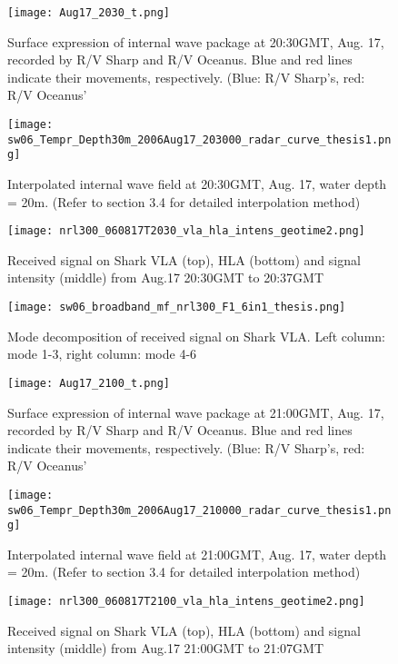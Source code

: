 \begin{figure}[H]
  \centering
  \texttt{[image: Aug17\_2030\_t.png]}
  \caption{Surface expression of internal wave package at 20:30GMT, Aug. 17, recorded by R/V Sharp and R/V Oceanus. Blue and red lines indicate their movements, respectively. (Blue: R/V Sharp's, red: R/V Oceanus'}\label{fig:r2130_r}
\end{figure}

\begin{figure}[H]
  \centering
  \texttt{[image: sw06\_Tempr\_Depth30m\_2006Aug17\_203000\_radar\_curve\_thesis1.png]}
  \caption{Interpolated internal wave field at 20:30GMT, Aug. 17, water depth = 20m. (Refer to section 3.4 for detailed interpolation method)}\label{fig:r2130_i}
\end{figure}

\begin{figure}[H]
  \centering
  \texttt{[image: nrl300\_060817T2030\_vla\_hla\_intens\_geotime2.png]}
  \caption{Received signal on Shark VLA (top), HLA (bottom) and signal intensity (middle) from Aug.17 20:30GMT to 20:37GMT }\label{fig:a2130}
\end{figure}

\begin{figure}[H]
  \centering
  \texttt{[image: sw06\_broadband\_mf\_nrl300\_F1\_6in1\_thesis.png]}
  \caption{Mode decomposition of received signal on Shark VLA. 
    Left column: mode 1-3, right column: mode 4-6 }\label{fig:m2130}
\end{figure}



\begin{figure}[H]
  \centering
  \texttt{[image: Aug17\_2100\_t.png]}
  \caption{Surface expression of internal wave package at 21:00GMT, Aug. 17, recorded by R/V Sharp and R/V Oceanus. Blue and red lines indicate their movements, respectively. (Blue: R/V Sharp's, red: R/V Oceanus'}\label{fig:r2130_r}
\end{figure}

\begin{figure}[H]
  \centering
  \texttt{[image: sw06\_Tempr\_Depth30m\_2006Aug17\_210000\_radar\_curve\_thesis1.png]}
  \caption{Interpolated internal wave field at 21:00GMT, Aug. 17, water depth = 20m. (Refer to section 3.4 for detailed interpolation method)}\label{fig:r2130_i}
\end{figure}

\begin{figure}[H]
  \centering
  \texttt{[image: nrl300\_060817T2100\_vla\_hla\_intens\_geotime2.png]}
  \caption{Received signal on Shark VLA (top), HLA (bottom) and signal intensity (middle) from Aug.17 21:00GMT to 21:07GMT }\label{fig:a2130}
\end{figure}

